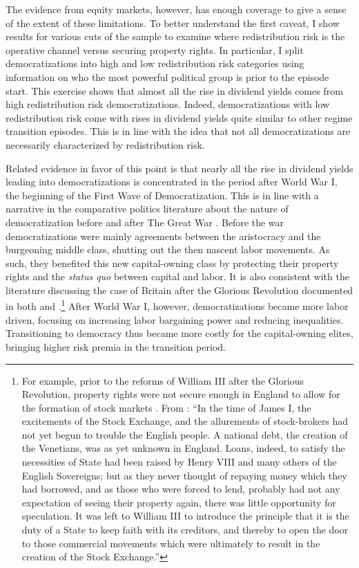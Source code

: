 \label{par:low_redist_evidence1}
The evidence from equity markets, however, has enough coverage to give a sense of the extent of these limitations. To better understand the first caveat, I show results for various cuts of the sample to examine where redistribution risk is the operative channel versus securing property rights. In particular, I split democratizations into high and low redistribution risk categories using information on who the most powerful political group is prior to the episode start. This exercise shows that almost all the rise in dividend yields comes from high redistribution risk democratizations.  Indeed, democratizations with low redistribution risk come with rises in dividend yields quite similar to other regime transition episodes. This is in line with the idea that not all democratizations are necessarily characterized by redistribution risk.

\label{par:low_redist_evidence2}
Related evidence in favor of this point is that nearly all the rise in dividend yields leading into democratizations is concentrated in the period after World War I, the beginning of the First Wave of Democratization.  This is in line with a narrative in the comparative politics literature about the nature of democratization before and after The Great War \citep{Luebbert1991}. Before the war democratizations were mainly agreements between the aristocracy and the burgeoning middle class, shutting out the then nascent labor movements. As such, they benefited this new capital-owning class by protecting their property rights and the \textit{status quo} between capital and labor. It is also consistent with the literature discussing the case of Britain after the Glorious Revolution documented in both \cite{North1989} and \cite{Acemoglu2006}.\footnote{For example, prior to the reforms of William III after the Glorious Revolution, property rights were not secure enough in England to allow for the formation of stock markets \citep{Brodhurst1897}. From \cite{Brodhurst1897}: ``In the time of James I, the excitements of the Stock Exchange, and the allurements of stock-brokers had not yet begun to trouble the English people. A national debt, the creation of the Venetians, was as yet unknown in England. Loans, indeed, to satisfy the necessities of State had been raised by Henry VIII and many others of the English Sovereigns; but as they never thought of repaying money which they had borrowed, and as those who were forced to lend, probably had not any expectation of seeing their property again, there was little opportunity for speculation. It was left to William III to introduce the principle that it is the duty of a State to keep faith with its creditors, and thereby to open the door to those commercial movements which were ultimately to result in the creation of the Stock Exchange.''} After World War I, however, democratizations became more labor driven, focusing on increasing labor bargaining power and reducing inequalities. Transitioning to democracy thus became more costly for the capital-owning elites, bringing higher risk premia in the transition period.

